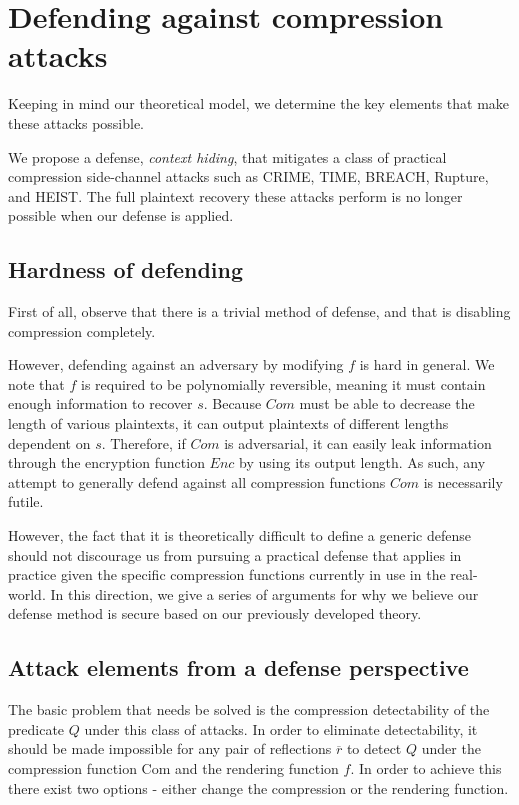 \section{Defending against compression attacks}\label{sec:defense}
Keeping in mind our theoretical model, we determine the key elements that make these
attacks possible.

We propose a defense, \textit{context hiding}, that mitigates a class of
practical compression side-channel attacks such as CRIME, TIME, BREACH, Rupture,
and HEIST. The full plaintext recovery these attacks perform is no longer
possible when our defense is applied.

\subsection{Hardness of defending}
First of all, observe that there is a trivial method of defense, and that is
disabling compression completely.

However, defending against an adversary by modifying $f$ is hard in general. We
note that $f$ is required to be polynomially reversible, meaning it must contain
enough information to recover $s$. Because $Com$ must be able to decrease the
length of various plaintexts, it can output plaintexts of different lengths
dependent on $s$. Therefore, if $Com$ is adversarial, it can easily leak
information through the encryption function $Enc$ by using its output length. As
such, any attempt to generally defend against all compression functions $Com$ is
necessarily futile.

However, the fact that it is theoretically difficult to define a generic defense
should not discourage us from pursuing a practical defense that applies in
practice given the specific compression functions currently in use in the
real-world.  In this direction, we give a series of arguments for why we believe
our defense method is secure based on our previously developed theory.

\subsection{Attack elements from a defense perspective}
The basic problem that needs be solved is the compression detectability of the
predicate $Q$ under this class of attacks. In order to eliminate detectability,
it should be made impossible for any pair of reflections $\overbar{r}$ to detect
$Q$ under the compression function $\textrm{Com}$ and the rendering function
$f$. In order to achieve this there exist two options - either change the
compression or the rendering function.

